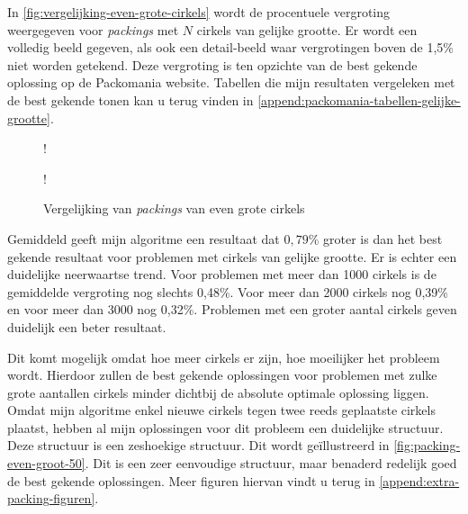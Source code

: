 \documentclass[12pt,a4paper,oneside]{book}
\begin{document}
{In \autoref{fig:vergelijking-even-grote-cirkels} wordt de procentuele vergroting weergegeven voor \textit{packings} met $N$ cirkels van gelijke grootte.
Er wordt een volledig beeld gegeven, als ook een detail-beeld waar vergrotingen boven de 1,5\% niet worden getekend.
Deze vergroting is ten opzichte van de best gekende oplossing op de Packomania website.
Tabellen die mijn resultaten vergeleken met de best gekende tonen kan u terug vinden in \autoref{append:packomania-tabellen-gelijke-grootte}.

\begin {figure}
	\centering
	 {!} {
	}
	 {!} {
	}
	\caption{Vergelijking van \textit{packings} van even grote cirkels}
	\label{fig:vergelijking-even-grote-cirkels}
\end {figure}

Gemiddeld geeft mijn algoritme een resultaat dat $0,79\%$ groter is dan het best gekende resultaat voor problemen met cirkels van gelijke grootte.
Er is echter een duidelijke neerwaartse trend.
Voor problemen met meer dan 1000 cirkels is de gemiddelde vergroting nog slechts 0,48\%.
Voor meer dan 2000 cirkels nog 0,39\% en voor meer dan 3000 nog 0,32\%.
Problemen met een groter aantal cirkels geven duidelijk een beter resultaat.

Dit komt mogelijk omdat hoe meer cirkels er zijn, hoe moeilijker het probleem wordt.
Hierdoor zullen de best gekende oplossingen voor problemen met zulke grote aantallen cirkels minder dichtbij de absolute optimale oplossing liggen.
Omdat mijn algoritme enkel nieuwe cirkels tegen twee reeds geplaatste cirkels plaatst, hebben al mijn oplossingen voor dit probleem een duidelijke structuur.
Deze structuur is een zeshoekige structuur.
Dit wordt geïllustreerd in \autoref{fig:packing-even-groot-50}.
Dit is een zeer eenvoudige structuur, maar benaderd redelijk goed de best gekende oplossingen.
Meer figuren hiervan vindt u terug in \autoref{append:extra-packing-figuren}.

}
\end{document}
